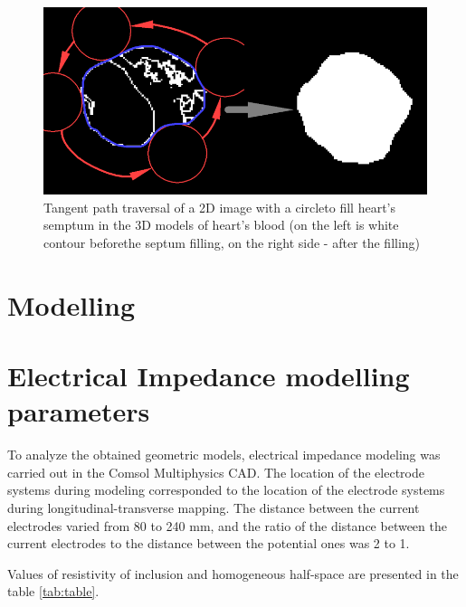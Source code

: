 \documentclass[conference]{IEEEtran}
\begin{document}
\begin{figure}[tbph]
    \centering
    \includegraphics[width=\linewidth]{fig/algo2}
    \caption{Tangent path traversal of a 2D image with a circleto fill heart's semptum
    in the 3D models of heart's blood (on the left is white contour beforethe septum filling,
        on the right side - after the filling)}
    \label{fig:algo2}
\end{figure}

\section{Modelling}
\section{Electrical Impedance modelling parameters}
To analyze the obtained geometric models, electrical impedance modeling was
carried out in the Comsol Multiphysics CAD. The location of the electrode
systems during modeling corresponded to the location of the electrode systems
during longitudinal-transverse mapping. The distance between the current
electrodes varied from 80 to 240 mm, and the ratio of the distance between the
current electrodes to the distance between the potential ones was 2 to 1.

Values of resistivity of inclusion and homogeneous half-space are presented in
the table \ref{tab:table}.
\end{document}
